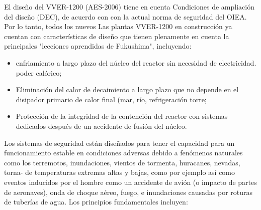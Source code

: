 \documentclass[]{article}
\begin{document}
El diseño del VVER-1200 (AES-2006) tiene en cuenta
Condiciones de ampliación del diseño (DEC), de acuerdo con
con la actual norma de seguridad del OIEA. Por lo tanto, todos los nuevos
Las plantas VVER-1200 en construcción ya cuentan con
características de diseño que tienen plenamente en cuenta la
principales "lecciones aprendidas de Fukushima", incluyendo:\\

\begin{itemize}
	\item enfriamiento a largo plazo del núcleo del reactor sin necesidad de electricidad.
	poder calórico;
	\item Eliminación del calor de decaimiento a largo plazo que no depende
	en el disipador primario de calor final (mar, río, refrigeración
	torre;
	\item Protección de la integridad de la contención del reactor con
	sistemas dedicados después de un accidente de fusión del núcleo.
\end{itemize}

Los sistemas de seguridad están diseñados para tener el capacidad para un funcionamiento estable en condiciones adversas
debido a fenómenos naturales como los terremotos,
inundaciones, vientos de tormenta, huracanes, nevadas, torna-
de temperaturas extremas altas y bajas, como por ejemplo
así como eventos inducidos por el hombre como un accidente de avión
(o impacto de partes de aeronaves), onda de choque aéreo, fuego,
e inundaciones causadas por roturas de tuberías de agua.
Los principios fundamentales incluyen:\\
\end{document}
